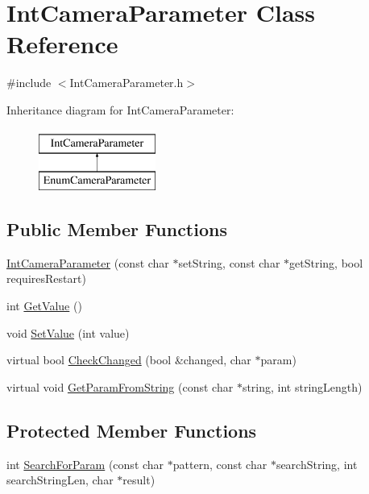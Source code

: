 \hypertarget{classIntCameraParameter}{
\section{IntCameraParameter Class Reference}
\label{classIntCameraParameter}
}


{\ttfamily \#include $<$IntCameraParameter.h$>$}

Inheritance diagram for IntCameraParameter:\begin{figure}[H]
\begin{center}
\leavevmode
\includegraphics[height=2.000000cm]{classIntCameraParameter}
\end{center}
\end{figure}
\subsection*{Public Member Functions}
\begin{DoxyCompactItemize}
\item 
\hyperlink{classIntCameraParameter_a3bbf3fddef980503c8caad2b97761364}{IntCameraParameter} (const char $\ast$setString, const char $\ast$getString, bool requiresRestart)
\item 
int \hyperlink{classIntCameraParameter_a93c7c5b5d2afd44b87859715ad93dd0e}{GetValue} ()
\item 
void \hyperlink{classIntCameraParameter_a3d41b2aafcafd18e21d59009c18fcf3c}{SetValue} (int value)
\item 
virtual bool \hyperlink{classIntCameraParameter_ad3413a2b04463911f435e8d927b8a490}{CheckChanged} (bool \&changed, char $\ast$param)
\item 
virtual void \hyperlink{classIntCameraParameter_a12c5199693d1971c6feaaf634d50cca9}{GetParamFromString} (const char $\ast$string, int stringLength)
\end{DoxyCompactItemize}
\subsection*{Protected Member Functions}
\begin{DoxyCompactItemize}
\item 
int \hyperlink{classIntCameraParameter_a4dbe484356293bd2acef171982b14cf7}{SearchForParam} (const char $\ast$pattern, const char $\ast$searchString, int searchStringLen, char $\ast$result)
\end{DoxyCompactItemize}
